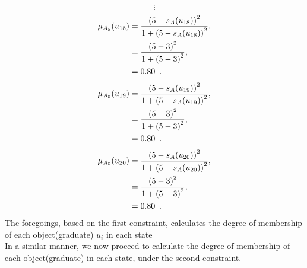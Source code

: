 \documentclass[a4paper,openany]{book}
\begin{document}
				\[
					\vdots
				\]
				\begin{align}
					\mu_{A_5}(u_{18}) &= \frac{\left(5-s_A(u_{18})\right)^2}{1 + \left(5-s_A(u_{18})\right)^2} ,\\
					&= \frac{\left(5-3\right)^2}{1 + \left(5-3\right)^2} \notag ,\\
					&= 0.80 \enspace. \notag
				\end{align}
				\begin{align}
					\mu_{A_5}(u_{19}) &= \frac{\left(5-s_A(u_{19})\right)^2}{1 + \left(5-s_A(u_{19})\right)^2} ,\\
					&= \frac{\left(5-3\right)^2}{1 + \left(5-3\right)^2} \notag ,\\
					&= 0.80 \enspace. \notag
				\end{align}
				\begin{align}
					\mu_{A_5}(u_{20}) &= \frac{\left(5-s_A(u_{20})\right)^2}{1 + \left(5-s_A(u_{20})\right)^2} ,\\
					&= \frac{\left(5-3\right)^2}{1 + \left(5-3\right)^2} \notag ,\\
					&= 0.80 \enspace. \notag
				\end{align}
			The foregoings, based on the first constraint, calculates the degree of membership of each object(graduate) $u_i$ in each state
			\\
			In a similar manner, we now proceed to calculate the degree of membership of each object(graduate) in each state, under the second constraint.
\end{document}
